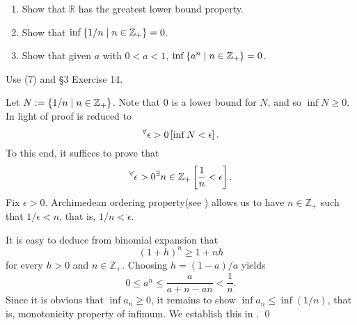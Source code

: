 \documentclass[a4paper,12pt]{article}
\begin{document}
\begin{exe}\leavevmode \par
	\begin{enumerate}
		\item
		      Show that \( \mathbb{R} \) has the greatest lower bound property.
		      
		\item
		      Show that \( \inf{\left\{ 1/n \;|\;n \in \mathbb{Z}_{+} \right\}}=0 \).
		      
		\item
		      Show that given \( a \) with \( 0<a<1 \),
		      \( \inf{\left\{ a^n \;|\;n \in \mathbb{Z}_{+} \right\}}=0 \).
	\end{enumerate}
\end{exe}\begin{sol}\leavevmode \par
	Use (7) and \S3 Exercise 14.
	
	Let
	\( N:= \left\{ 1/n \;|\; n \in \mathbb{Z}_{+}  \right\} \).
	Note that \( 0 \) is a lower bound for \( N \),
	and so \( \inf{N} \ge 0\).
	In light of 
	proof is reduced to
	\begin{equation*}
		{}^{\forall}  \epsilon > 0 \left[ \inf{N} < \epsilon \right].
	\end{equation*}
	To this end, it suffices to prove that
	\begin{equation*}
		{}^{\forall}  \epsilon > 0
		{}^{\exists} n \in \mathbb{Z}_{+}
		\left[ \frac{1}{n} < \epsilon \right].
	\end{equation*}
	Fix 
	\( \epsilon > 0  \).
	Archimedean ordering property(see ) allows us to have
	\( n \in \mathbb{Z}_{+} \)
	such that
	\( 1/\epsilon < n \),
	that is,
	\( 1/n < \epsilon \).
	
	It is easy to deduce from binomial expansion that
	\begin{equation*}
		(1+h)^{n} \ge 1+ nh
	\end{equation*}
	for every
	\( h>0 \)
	and
	\( n \in \mathbb{Z}_{+} \).
	Choosing
	\( h= (1-a)/a \)
	yields
	\begin{equation*}
		0 \le a^n \le \frac{a}{a + n - an} < \frac{1}{n}.
	\end{equation*}
	Since it is obvious that
	\( \inf{a_n} \ge 0 \),
	it remains to show 
	\( \inf{a_n} \le \inf{(1/n)} \),
	that is,
	monotonicity property of infimum.
	We establish this in .
	\qed\end{sol}
\end{document}
